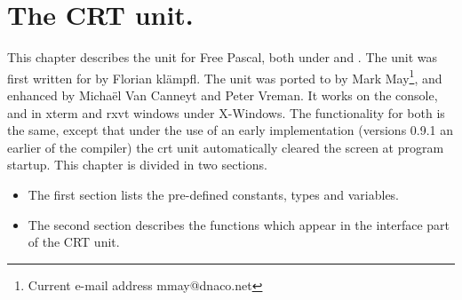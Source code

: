 %
%
%
%
%
\chapter{The CRT unit.}
\label{ch:crtunit}
This chapter describes the  unit for Free Pascal, both under \dos
and \linux. The unit was first written for \dos by Florian kl\"ampfl. 
The unit was ported to \linux by Mark May\footnote{Current
e-mail address \textsf{mmay@dnaco.net}}, and enhanced by Micha\"el Van Canneyt
and Peter Vreman. It works on the \linux console, and in xterm and rxvt windows
under X-Windows. The functionality for both is the same, except that under
\linux the use of an early implementation (versions 0.9.1 an earlier of the
compiler) the crt unit automatically cleared the screen at program startup.
This chapter is divided in two sections. 
\begin{itemize}
\item The first section lists the pre-defined constants, types and variables. 
\item The second section describes the functions which appear in the
interface part of the CRT unit.
\end{itemize}
